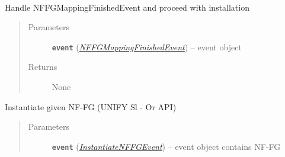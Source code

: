 \documentclass[letterpaper,10pt,english]{sphinxmanual}
\begin{document}
\begin{fulllineitems}
\begin{fulllineitems}


{\hyperref[util/api:escape.util.api.AbstractAPI.initialize]{\emph{}}}



\end{fulllineitems}


\begin{fulllineitems}
\label{orchest/ros_API:escape.orchest.ros_API.ResourceOrchestrationAPI.shutdown}~



{\hyperref[util/api:escape.util.api.AbstractAPI.shutdown]{\emph{}}}



\end{fulllineitems}


\begin{fulllineitems}
\label{orchest/ros_API:escape.orchest.ros_API.ResourceOrchestrationAPI._handle_NFFGMappingFinishedEvent}
Handle NFFGMappingFinishedEvent and proceed with  {\hyperref[util/nffg:escape.util.nffg.NFFG]{\emph{}}} installation
\begin{quote}\begin{description}
\item[{Parameters}] \leavevmode
\textbf{\texttt{event}} ({\hyperref[orchest/ros_mapping:escape.orchest.ros_mapping.NFFGMappingFinishedEvent]{\emph{\emph{NFFGMappingFinishedEvent}}}}) -- event object

\item[{Returns}] \leavevmode
None

\end{description}\end{quote}

\end{fulllineitems}


\begin{fulllineitems}
\label{orchest/ros_API:escape.orchest.ros_API.ResourceOrchestrationAPI._handle_InstantiateNFFGEvent}
Instantiate given NF-FG (UNIFY Sl - Or API)
\begin{quote}\begin{description}
\item[{Parameters}] \leavevmode
\textbf{\texttt{event}} ({\hyperref[service/sas_API:escape.service.sas_API.InstantiateNFFGEvent]{\emph{\emph{InstantiateNFFGEvent}}}}) -- event object contains NF-FG


\end{description}
\end{quote}
\end{fulllineitems}
\end{fulllineitems}
\end{document}
